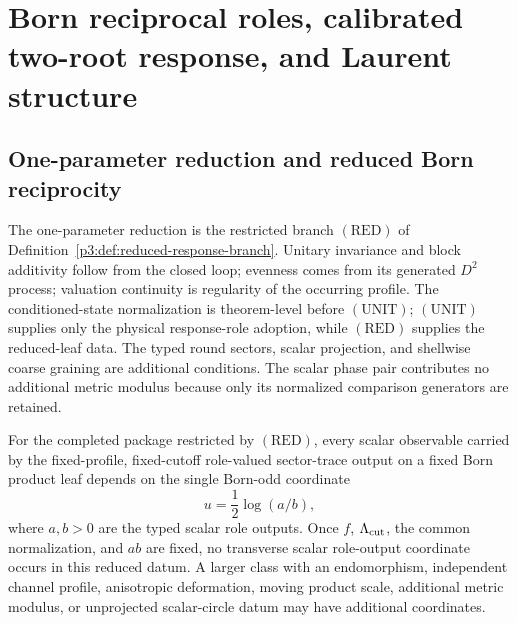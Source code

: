 \documentclass[12pt,a4paper]{article}
\begin{document}
\section{Born reciprocal roles, calibrated two-root response, and Laurent structure}
\label{paper3d:sec:organized-response}
\subsection{One-parameter reduction and reduced Born reciprocity}
\label{p3:sec:reduced_reciprocity}

The one-parameter reduction is the restricted branch \((\mathrm{RED})\) of
Definition~\ref{p3:def:reduced-response-branch}.  Unitary invariance and block
additivity follow from the closed loop; evenness comes from its generated
\(D^2\) process; valuation continuity is regularity of the occurring profile.
The conditioned-state normalization is theorem-level before
\((\mathrm{UNIT})\); \((\mathrm{UNIT})\) supplies only the physical
response-role adoption, while \((\mathrm{RED})\) supplies the reduced-leaf
data.  The typed
round sectors, scalar projection, and shellwise coarse graining are additional
conditions.  The scalar phase pair contributes no additional metric modulus
because only its normalized comparison generators are retained.

\begin{theorem}
\label{p3:prop:one_parameter_reduction}
\label{p3:thm:one-parameter-reduction}
For the completed package restricted by \((\mathrm{RED})\), every scalar
observable carried by the fixed-profile, fixed-cutoff role-valued sector-trace
output on a fixed
Born product leaf depends on the single Born-odd coordinate
\[
 u=\frac12\log(a/b),
\]
where \(a,b>0\) are the typed scalar role outputs.
Once \(f\), \(\Lambda_{\mathrm{cut}}\), the common normalization, and \(ab\) are fixed, no
transverse scalar role-output coordinate occurs in this reduced datum.  A larger class with an endomorphism, independent channel profile,
anisotropic deformation, moving product scale, additional metric modulus, or
unprojected scalar-circle datum may have additional coordinates.
\end{theorem}
\end{document}
